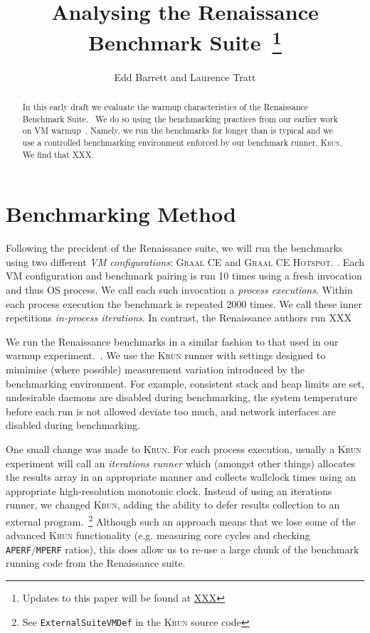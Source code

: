 \documentclass[a4paper]{article}
\newcommand{\krun}{\textsc{Krun}\xspace}
\newcommand{\graalce}{\textsc{Graal CE}\xspace}
\newcommand{\graalcehs}{\textsc{Graal CE Hotspot}\xspace}
\begin{document}
\title{Analysing the Renaissance Benchmark Suite~\footnote{Updates to this paper will be found at \url{XXX}}}

\author{Edd Barrett and Laurence Tratt}

\maketitle

\begin{abstract}
\noindent In this early draft we evaluate the warmup characteristics of the
Renaissance Benchmark Suite.~\cite{prokopec19renaissance} We do so using the
benchmarking practices from our earlier work on VM
warmup~\cite{barrett16warmup}. Namely, we run the benchmarks for longer than is
typical and we use a controlled benchmarking environment enforced by our
benchmark runner, \krun. We find that XXX.
\end{abstract}


\section{Benchmarking Method}
\label{sec:eval}

Following the precident of the Renaissance suite, we will run the benchmarks
using two different \emph{VM configurations}: \graalce and \graalcehs.
. Each VM configuration and benchmark pairing is run 10
times using a fresh invocation and thus OS process. We call each such
invocation a \emph{process executions}. Within each process execution the
benchmark is repeated 2000 times. We call these inner repetitions
\emph{in-process iterations}. In contrast, the Renaissance authors run
XXX

We run the Renaissance benchmarks in a similar fashion to that used in our
warmup experiment.~\cite{barrett16warmup}. We use the \krun runner with
settings designed to mimimise (where possible) measurement variation introduced
by the benchmarking environment. For example, consistent stack and heap limits
are set, undesirable daemons are disabled during benchmarking, the system
temperature before each run is not allowed deviate too much, and network
interfaces are disabled during benchmarking.

One small change was made to \krun. For each process execution, usually a
\krun experiment will call an \emph{iterations runner} which (amongst other
things) allocates the results array in an appropriate manner and collects
wallclock times using an appropriate high-resolution monotonic clock. Instead
of using an iterations runner, we changed \krun, adding the ability to defer
results collection to an external program.~\footnote{See
\texttt{ExternalSuiteVMDef} in the \krun source code} Although such an approach
means that we lose some of the advanced \krun functionality (e.g.
measuring core cycles and checking \texttt{APERF}/\texttt{MPERF} ratios), this
does allow us to re-use a large chunk of the benchmark running code from the
Renaissance suite.
\end{document}
